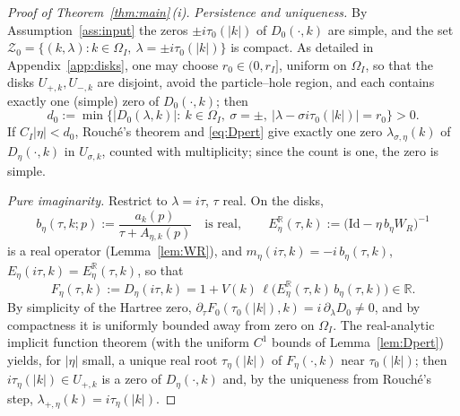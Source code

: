 \documentclass[11pt,a4paper]{amsart}
\theoremstyle{definition}
\theoremstyle{remark}
\newcommand{\R}{\mathbb{R}}
\newcommand{\Id}{\mathrm{Id}}
\newcommand{\ellf}{\ell}
\begin{document}
\begin{proof}[Proof of Theorem~\ref{thm:main}\,(i)]
\emph{Persistence and uniqueness.} By Assumption~\ref{ass:input} the zeros $\pm i\tau_0(|k|)$ of $D_0(\cdot,k)$ are simple, and the set $\mathcal Z_0=\{(k,\lambda):k\in\Omega_I,\ \lambda=\pm i\tau_0(|k|)\}$ is compact. As detailed in Appendix~\ref{app:disks}, one may choose $r_0\in(0,r_I]$, uniform on $\Omega_I$, so that the disks $U_{+,k},U_{-,k}$ are disjoint, avoid the particle--hole region, and each contains exactly one (simple) zero of $D_0(\cdot,k)$; then
\begin{equation}\label{eq:d0}
d_0:=\min\bigl\{|D_0(\lambda,k)|:\ k\in\Omega_I,\ \sigma=\pm,\ |\lambda-\sigma i\tau_0(|k|)|=r_0\bigr\}>0 .
\end{equation}
If $C_I|\eta|<d_0$, Rouch\'e's theorem and \eqref{eq:Dpert} give exactly one zero $\lambda_{\sigma,\eta}(k)$ of $D_\eta(\cdot,k)$ in $U_{\sigma,k}$, counted with multiplicity; since the count is one, the zero is simple.

\emph{Pure imaginarity.} Restrict to $\lambda=i\tau$, $\tau$ real. On the disks,
\begin{equation}\label{eq:breal}
b_\eta(\tau,k;p):=\frac{a_k(p)}{\tau+A_{\eta,k}(p)}\quad\text{is real},\qquad
E^{\R}_\eta(\tau,k):=\bigl(\Id-\eta\,b_\eta W_R\bigr)^{-1}
\end{equation}
is a real operator (Lemma~\ref{lem:WR}), and $m_\eta(i\tau,k)=-i\,b_\eta(\tau,k)$, $E_\eta(i\tau,k)=E^\R_\eta(\tau,k)$, so that
\begin{equation}\label{eq:F}
F_\eta(\tau,k):=D_\eta(i\tau,k)=1+V(k)\,\ellf\bigl(E^\R_\eta(\tau,k)\,b_\eta(\tau,k)\bigr)\in\R .
\end{equation}
By simplicity of the Hartree zero, $\partial_\tau F_0(\tau_0(|k|),k)=i\,\partial_\lambda D_0\ne0$, and by compactness it is uniformly bounded away from zero on $\Omega_I$. The real-analytic implicit function theorem (with the uniform $C^1$ bounds of Lemma~\ref{lem:Dpert}) yields, for $|\eta|$ small, a unique real root $\tau_\eta(|k|)$ of $F_\eta(\cdot,k)$ near $\tau_0(|k|)$; then $i\tau_\eta(|k|)\in U_{+,k}$ is a zero of $D_\eta(\cdot,k)$ and, by the uniqueness from Rouch\'e's step, $\lambda_{+,\eta}(k)=i\tau_\eta(|k|)$.


\end{proof}
\end{document}
